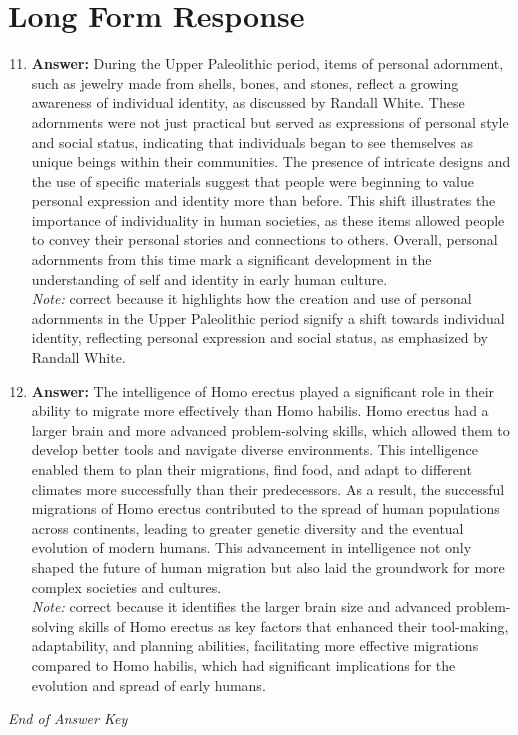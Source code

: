 \documentclass[12pt]{article}
\begin{document}
\section*{Long Form Response}
\begin{enumerate}[label=\arabic*.]
\setcounter{enumi}{10}
\item \textbf{Answer:} During the Upper Paleolithic period, items of personal adornment, such as jewelry made from shells, bones, and stones, reflect a growing awareness of individual identity, as discussed by Randall White. These adornments were not just practical but served as expressions of personal style and social status, indicating that individuals began to see themselves as unique beings within their communities. The presence of intricate designs and the use of specific materials suggest that people were beginning to value personal expression and identity more than before. This shift illustrates the importance of individuality in human societies, as these items allowed people to convey their personal stories and connections to others. Overall, personal adornments from this time mark a significant development in the understanding of self and identity in early human culture.
\\ \textit{Note:} correct because it highlights how the creation and use of personal adornments in the Upper Paleolithic period signify a shift towards individual identity, reflecting personal expression and social status, as emphasized by Randall White.
\item \textbf{Answer:} The intelligence of Homo erectus played a significant role in their ability to migrate more effectively than Homo habilis. Homo erectus had a larger brain and more advanced problem-solving skills, which allowed them to develop better tools and navigate diverse environments. This intelligence enabled them to plan their migrations, find food, and adapt to different climates more successfully than their predecessors. As a result, the successful migrations of Homo erectus contributed to the spread of human populations across continents, leading to greater genetic diversity and the eventual evolution of modern humans. This advancement in intelligence not only shaped the future of human migration but also laid the groundwork for more complex societies and cultures.
\\ \textit{Note:} correct because it identifies the larger brain size and advanced problem-solving skills of Homo erectus as key factors that enhanced their tool-making, adaptability, and planning abilities, facilitating more effective migrations compared to Homo habilis, which had significant implications for the evolution and spread of early humans.
\end{enumerate}

\vfill
\noindent\textit{End of Answer Key}
\end{document}
